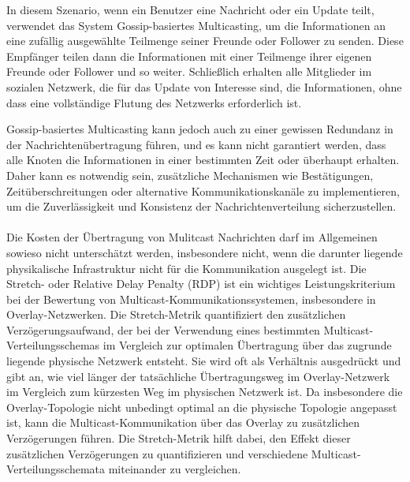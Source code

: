 \documentclass[../vs-script-first-v01.tex]{subfiles}
\begin{document}
In diesem Szenario, wenn ein Benutzer eine Nachricht oder ein Update teilt, verwendet das System Gossip-basiertes Multicasting, um die Informationen an eine zufällig ausgewählte Teilmenge seiner Freunde oder Follower zu senden. Diese Empfänger teilen dann die Informationen mit einer Teilmenge ihrer eigenen Freunde oder Follower und so weiter. Schließlich erhalten alle Mitglieder im sozialen Netzwerk, die für das Update von Interesse sind, die Informationen, ohne dass eine vollständige Flutung des Netzwerks erforderlich ist.

Gossip-basiertes Multicasting kann jedoch auch zu einer gewissen Redundanz in der Nachrichtenübertragung führen, und es kann nicht garantiert werden, dass alle Knoten die Informationen in einer bestimmten Zeit oder überhaupt erhalten. Daher kann es notwendig sein, zusätzliche Mechanismen wie Bestätigungen, Zeitüberschreitungen oder alternative Kommunikationskanäle zu implementieren, um die Zuverlässigkeit und Konsistenz der Nachrichtenverteilung sicherzustellen.
\\\\
Die Kosten der Übertragung von Mulitcast Nachrichten darf im Allgemeinen sowieso nicht unterschätzt werden, insbesondere nicht, wenn die darunter liegende physikalische Infrastruktur nicht für die Kommunikation ausgelegt ist. Die Stretch- oder Relative Delay Penalty (RDP) ist ein wichtiges Leistungskriterium bei der Bewertung von Multicast-Kommunikationssystemen, insbesondere in Overlay-Netzwerken. Die Stretch-Metrik quantifiziert den zusätzlichen Verzögerungsaufwand, der bei der Verwendung eines bestimmten Multicast-Verteilungsschemas im Vergleich zur optimalen Übertragung über das zugrunde liegende physische Netzwerk entsteht. Sie wird oft als Verhältnis ausgedrückt und gibt an, wie viel länger der tatsächliche Übertragungsweg im Overlay-Netzwerk im Vergleich zum kürzesten Weg im physischen Netzwerk ist. Da insbesondere die Overlay-Topologie nicht unbedingt optimal an die physische Topologie angepasst ist, kann die Multicast-Kommunikation über das Overlay zu zusätzlichen Verzögerungen führen. Die Stretch-Metrik hilft dabei, den Effekt dieser zusätzlichen Verzögerungen zu quantifizieren und verschiedene Multicast-Verteilungsschemata miteinander zu vergleichen.
\end{document}
